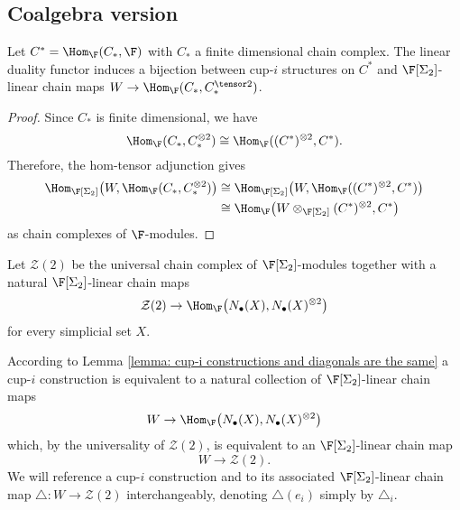 \subsection{Coalgebra version}

\begin{lemma} \label{lemma: cup-i constructions and diagonals are the same}
	Let $C^* = \Hom_{\F}(C_*, \F)$ with $C_*$ a finite dimensional chain complex. The linear duality functor induces a bijection between cup-$i$ structures on $C^*$ and $\F[\Sigma_2]$-linear chain maps $W \to \Hom_{\F}(C_*, C_*^{\tensor 2})$.
\end{lemma}

\begin{proof}
	Since $C_\ast$ is finite dimensional, we have
	\[
	\Hom_{\F}(C_\ast, C_\ast^{\otimes 2}) \cong \Hom_{\F}((C^\ast)^{\otimes 2}, C^\ast).
	\]
	Therefore, the hom-tensor adjunction gives
	\begin{align*}
	\Hom_{\F[\Sigma_2]}\big(W, \Hom_{\F}(C_\ast, C_\ast^{\otimes 2}) \big) & \cong
	\Hom_{\F[\Sigma_2]}\big(W, \Hom_{\F}((C^\ast)^{\otimes 2}, C^\ast) \big) \\ & \cong
	\Hom_{\F} \big(W \otimes_{\F[\Sigma_2]} (C^\ast)^{\otimes 2}, C^\ast \big)
	\end{align*}
	as chain complexes of $\F$-modules.
\end{proof}

\begin{definition}
	Let $\mathcal Z(2)$ be the universal chain complex of $\F[\Sigma_2]$-modules together with a natural $\F[\Sigma_2]$-linear chain maps
	\[
	\mathcal Z(2) \to \Hom_{\F}\big( N_\bullet(X), N_\bullet(X)^{\otimes 2} \big)
	\]
	for every simplicial set $X$.
\end{definition}

According to Lemma \ref{lemma: cup-i constructions and diagonals are the same} a cup-$i$ construction is equivalent to a natural collection of $\F[\Sigma_2]$-linear chain maps
\[
W \to \Hom_{\F}\big( N_\bullet(X), N_\bullet(X)^{\otimes 2} \big)
\]
which, by the universality of $\mathcal Z(2)$, is equivalent to an $\F[\Sigma_2]$-linear chain map
\[
W \to \mathcal Z(2).
\]
We will reference a cup-$i$ construction and to its associated $\F[\Sigma_2]$-linear chain map $\triangle \colon W \to \mathcal Z(2)$ interchangeably, denoting $\triangle(e_i)$ simply by $\triangle_i$.

